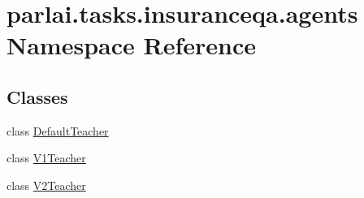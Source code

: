 \hypertarget{namespaceparlai_1_1tasks_1_1insuranceqa_1_1agents}{}\section{parlai.\+tasks.\+insuranceqa.\+agents Namespace Reference}
\label{namespaceparlai_1_1tasks_1_1insuranceqa_1_1agents}
\subsection*{Classes}
\begin{DoxyCompactItemize}
\item 
class \hyperlink{classparlai_1_1tasks_1_1insuranceqa_1_1agents_1_1DefaultTeacher}{Default\+Teacher}
\item 
class \hyperlink{classparlai_1_1tasks_1_1insuranceqa_1_1agents_1_1V1Teacher}{V1\+Teacher}
\item 
class \hyperlink{classparlai_1_1tasks_1_1insuranceqa_1_1agents_1_1V2Teacher}{V2\+Teacher}
\end{DoxyCompactItemize}
